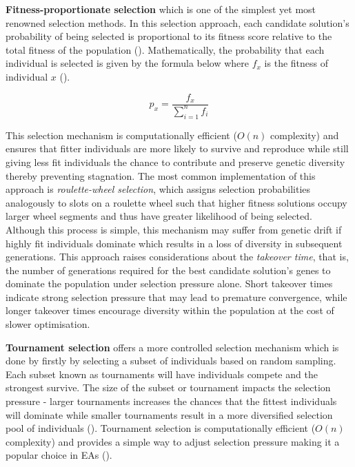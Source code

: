 \parbreak\noindent \textbf{Fitness-proportionate selection} which is one of the simplest yet most renowned selection methods. In this selection approach, each candidate solution's probability of being selected is proportional to its fitness score relative to the total fitness of the population (\cite{shukla2015comparative}). Mathematically, the probability that each individual is selected is given by the formula below where $f_x$ is the fitness of individual $x$ (\cite{shukla2015comparative}).
\begin{ceqn}
	\begin{equation}
		p_x = \frac{f_x}{\sum^{n}_{i=1}f_i}
	\end{equation}
\end{ceqn}
This selection mechanism is computationally efficient ($O(n)$ complexity) and ensures that fitter individuals are more likely to survive and reproduce while still giving less fit individuals the chance to contribute and preserve genetic diversity thereby preventing stagnation. The most common implementation of this approach is \textit{roulette-wheel selection}, which assigns selection probabilities analogously to slots on a roulette wheel such that higher fitness solutions occupy larger wheel segments and thus have greater likelihood of being selected. Although this process is simple, this mechanism may suffer from genetic drift if highly fit individuals dominate which results in a loss of diversity in subsequent generations. This approach raises considerations about the \textit{takeover time}, that is, the number of generations required for the best candidate solution's genes to dominate the population under selection pressure alone. Short takeover times indicate strong selection pressure that may lead to premature convergence, while longer takeover times encourage diversity within the population at the cost of slower optimisation.

\parbreak\noindent \textbf{Tournament selection} offers a more controlled selection mechanism which is done by firstly by selecting a subset of individuals based on random sampling. Each subset known as tournaments will have individuals compete and the strongest survive. The size of the subset or tournament impacts the selection pressure - larger tournaments increases the chances that the fittest individuals will dominate while smaller tournaments result in a more diversified selection pool of individuals (\cite{shukla2015comparative}). Tournament selection is computationally efficient ($O(n)$ complexity) and provides a simple way to adjust selection pressure making it a popular choice in EAs (\cite{shukla2015comparative}).

